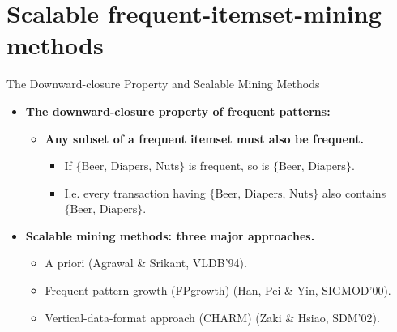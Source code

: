\section{Scalable frequent-itemset-mining methods}

\begin{frame}{The Downward-closure Property and Scalable Mining Methods}
	\begin{itemize}
		\item \textbf{The downward-closure property of frequent patterns:}
		      \begin{itemize}
			      \item \textbf{\color{airforceblue}Any subset of a frequent itemset
				            must also be frequent.}
			            \begin{itemize}
				            \item If $\{\text{Beer, Diapers, Nuts}\}$ is frequent, so is
				                  $\{\text{Beer, Diapers}\}$.
				            \item I.e. every transaction having $\{\text{Beer, Diapers,
						                  Nuts}\}$ also contains $\{\text{Beer, Diapers}\}$.
			            \end{itemize}
		      \end{itemize}
		\item \textbf{Scalable mining methods: three major approaches.}
		      \begin{itemize}
			      \item A priori (Agrawal \& Srikant, VLDB'94).
			      \item Frequent-pattern growth (FPgrowth) (Han, Pei \& Yin,
			            SIGMOD'00).
			      \item Vertical-data-format approach (CHARM) (Zaki \& Hsiao, SDM'02).
		      \end{itemize}
	\end{itemize}
\end{frame}

